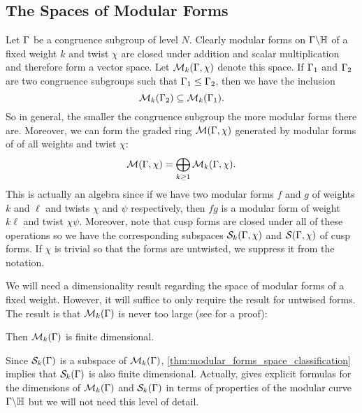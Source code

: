     \subsection*{The Spaces of Modular Forms}
      Let $\Gamma$ be a congruence subgroup of level $N$. Clearly modular forms on $\Gamma\backslash\mathbb{H}$ of a fixed weight $k$ and twist $\chi$ are closed under addition and scalar multiplication and therefore form a vector space. Let $\mathcal{M}_{k}(\Gamma,\chi)$ denote this space. If $\Gamma_{1}$ and $\Gamma_{2}$ are two congruence subgroups such that $\Gamma_{1} \le \Gamma_{2}$, then we have the inclusion
      \[
        \mathcal{M}_{k}(\Gamma_{2}) \subseteq \mathcal{M}_{k}(\Gamma_{1}).
      \]
      So in general, the smaller the congruence subgroup the more modular forms there are. Moreover, we can form the graded ring $\mathcal{M}(\Gamma,\chi)$ generated by modular forms of of all weights and twist $\chi$:
      \[
        \mathcal{M}(\Gamma,\chi) = \bigoplus_{k \ge 1}\mathcal{M}_{k}(\Gamma,\chi).
      \]
      This is actually an algebra since if we have two modular forms $f$ and $g$ of weights $k$ and $\ell$ and twists $\chi$ and $\psi$ respectively, then $fg$ is a modular form of weight $k\ell$ and twist $\chi\psi$. Moreover, note that cusp forms are closed under all of these operations so we have the corresponding subspaces $\mathcal{S}_{k}(\Gamma,\chi)$ and $\mathcal{S}(\Gamma,\chi)$ of cusp forms. If $\chi$ is trivial so that the forms are untwisted, we suppress it from the notation.

      We will need a dimensionality result regarding the space of modular forms of a fixed weight. However, it will suffice to only require the result for untwised forms. The result is that $\mathcal{M}_{k}(\Gamma)$ is never too large (see \cite{diamond2005first} for a proof):

      \begin{theorem}\label{thm:modular_forms_space_classification}
        Then $\mathcal{M}_{k}(\Gamma)$ is finite dimensional.
      \end{theorem}

      Since $\mathcal{S}_{k}(\Gamma)$ is a subspace of $\mathcal{M}_{k}(\Gamma)$, \cref{thm:modular_forms_space_classification} implies that $\mathcal{S}_{k}(\Gamma)$ is also finite dimensional. Actually, \cite{diamond2005first} gives explicit formulas for the dimensions of $\mathcal{M}_{k}(\Gamma)$ and $\mathcal{S}_{k}(\Gamma)$ in terms of properties of the modular curve $\Gamma\backslash\mathbb{H}$ but we will not need this level of detail.

